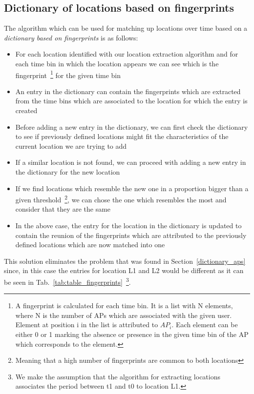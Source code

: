 \subsection{Dictionary of locations based on fingerprints}
\label{dictionary_fingerprints}
The algorithm which can be used for matching up locations over time based on a
\textit{dictionary based on fingerprints}
is as follows:
\begin{itemize}
  \item For each location identified with our location extraction algorithm and
  for each time bin in which the location appears we can see which is the
  fingerprint~\footnote{A fingerprint is calculated for each time bin. It is a
  list with N elements, where N is the number of APs which are associated with
  the given user. Element at position i in the list is attributed to $AP_{i}$.
  Each element can be either 0 or 1 marking the absence or presence in the given time bin of
  the AP which corresponds to the element.} for the given time bin 
  \item An entry in the dictionary can contain the fingerprints which are
  extracted from the time bins which are associated to the location for which
  the entry is created
  \item Before adding a new entry in the dictionary, we can first
  check the dictionary to see if previously defined locations might fit the
  characteristics of the current location we are trying to add
  \item If a similar location is not found, we can proceed with adding a new
  entry in the dictionary for the new location
  \item If we find locations which resemble the new one in a proportion bigger
  than a given threshold~\footnote{Meaning that a high number of fingerprints
  are common to both locations}, we can chose the one which resembles the most
  and consider that they are the same
  \item In the above case, the entry for the location in the dictionary
  is updated to contain the reunion of the fingerprints which are attributed
  to the previously defined locations which are now matched into one
\end{itemize}

This solution eliminates the problem that was found in
Section~\ref{dictionary_aps} since, in this case the entries for location L1 and
L2 would be different as it can be seen in
Tab.~\ref{tab:table_fingerprints}~\footnote{We make the assumption that the
algorithm for extracting locations associates the period between t1 and t0 to
location L1.}.

